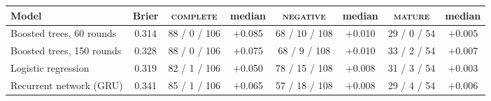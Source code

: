 \begin{tabular}{lccccccc}
\toprule
Model & Brier & \textsc{complete} & median & \textsc{negative} & median & \textsc{mature} & median \\
\midrule
Boosted trees, 60 rounds & 0.314 & 88 / 0 / 106 & $+$0.085 & 68 / 10 / 108 & $+$0.010 & 29 / 0 / 54 & $+$0.005 \\
Boosted trees, 150 rounds & 0.328 & 88 / 0 / 106 & $+$0.075 & 68 / 9 / 108 & $+$0.010 & 33 / 2 / 54 & $+$0.007 \\
Logistic regression & 0.319 & 82 / 1 / 106 & $+$0.050 & 78 / 15 / 108 & $+$0.008 & 31 / 3 / 54 & $+$0.003 \\
Recurrent network (GRU) & 0.341 & 85 / 1 / 106 & $+$0.065 & 57 / 18 / 108 & $+$0.008 & 29 / 4 / 54 & $+$0.006 \\
\bottomrule
\end{tabular}
